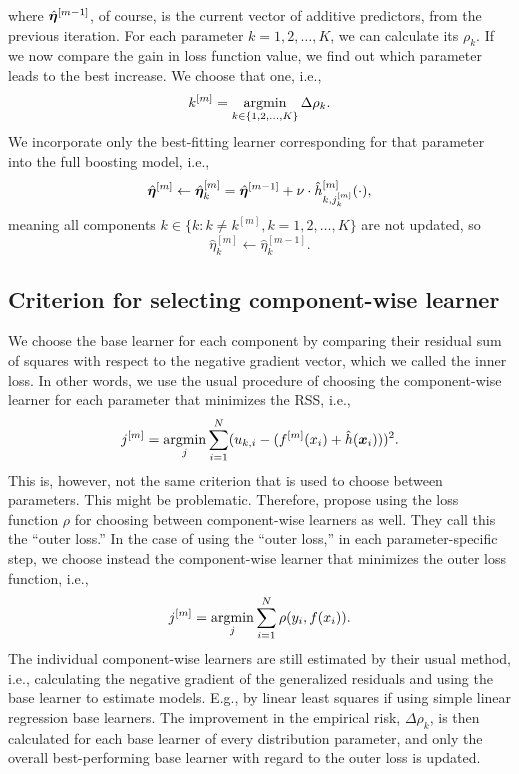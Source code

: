 where $\hat{\boldsymbol{\eta}}^{[m-1]}$, of course, is the current vector of additive predictors, from the previous iteration.
For each parameter $k=1,2,\ldots,K$, we can calculate its $\rho_{k}$.
If we now compare the gain in loss function value, we find out which parameter leads to the best increase. We choose that one, i.e.,
\begin{equation*}
    k^{[m]}=\operatorname*{argmin}_{k\in\{1,2,\ldots,K\}}\Delta\rho_{k}.
\end{equation*}
We incorporate only the best-fitting learner corresponding for that parameter into the full boosting model, i.e.,
\begin{equation*}
    \hat{\boldsymbol{\eta}}^{[m]}\gets \hat{\boldsymbol{\eta}}^{[m]}_{k}=\hat{\boldsymbol{\eta}}^{[m-1]}+\nu\cdot\hat{h}^{[m]}_{k,j_k^{[m]}}(\cdot),
\end{equation*}
meaning all components $k\in\{k\colon k\neq k^{[m]}, k=1,2,\ldots,K\}$ are not updated, so
\begin{equation*}
    \hat{\eta}_{k}^{[m]}\gets\hat{\eta}_{k}^{[m-1]}.
\end{equation*}

\subsection{Criterion for selecting component-wise learner}
We choose the base learner for each component by comparing their residual sum of squares with respect to the negative gradient vector, which we called the inner loss.
In other words, we use the usual procedure of choosing the component-wise learner for each parameter that minimizes the RSS, i.e.,
\begin{equation*}
    j^{[m]}=\operatorname*{argmin}_{j} \sum_{i=1}^N (u_{k,i}-(f^{[m]}(x_i)+\hat{h}(\bm{x}_i)))^2.
\end{equation*}
This is, however, not the same criterion that is used to choose between parameters.
This might be problematic.
Therefore, \citet{thomas2018} propose using the loss function $\rho$ for choosing between component-wise learners as well.
They call this the ``outer loss.''
In the case of using the ``outer loss,'' in each parameter-specific step, we choose instead the component-wise learner that minimizes the outer loss function, i.e., 
\begin{equation*}
    j^{[m]}=\operatorname*{argmin}_{j} \sum_{i=1}^N \rho(y_i,f(x_i)).
\end{equation*}
The individual component-wise learners are still estimated by their usual method, i.e., calculating the negative gradient of the generalized residuals and using the base learner to estimate models.
E.g., by linear least squares if using simple linear regression base learners.
The improvement in the empirical risk, $\Delta\rho_{k}$, is then calculated for each base learner of every distribution parameter, and only the overall best-performing base learner with regard to the outer loss is updated.

